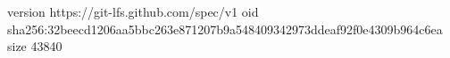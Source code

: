 version https://git-lfs.github.com/spec/v1
oid sha256:32beecd1206aa5bbc263e871207b9a548409342973ddeaf92f0e4309b964c6ea
size 43840
